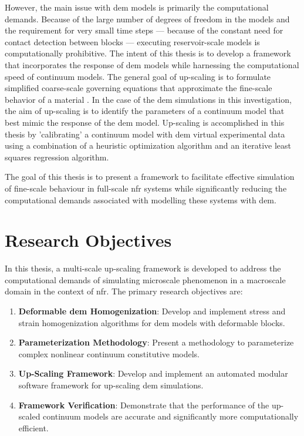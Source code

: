 However, the main issue with \acrshort{dem} models is primarily the computational demands. Because of the large number of degrees of freedom in the models and the requirement for very small time steps --- because of the constant need for contact detection between blocks --- executing reservoir-scale models is computationally prohibitive. The intent of this thesis is to develop a framework that incorporates the response of \acrshort{dem} models while harnessing the computational speed of continuum models. The general goal of up-scaling is to formulate simplified coarse-scale governing equations that approximate the fine-scale behavior of a material \citep{Geers_2010}. In the case of the \acrshort{dem} simulations in this investigation, the aim of up-scaling is to identify the parameters of a continuum model that best mimic the response of the \acrshort{dem} model.  Up-scaling is accomplished in this thesis by 'calibrating' a continuum model with \acrshort{dem} virtual experimental data using a combination of a heuristic optimization algorithm and an iterative least squares regression algorithm.

The goal of this thesis is to present a framework to facilitate effective simulation of fine-scale behaviour in full-scale \acrshort{nfr} systems while significantly reducing the computational demands associated with modelling these systems with \acrshort{dem}. 

\section{Research Objectives}

In this thesis, a multi-scale up-scaling framework is developed to address the computational demands of simulating microscale phenomenon in a macroscale domain in the context of \acrshort{nfr}. The primary research objectives are:

\begin{enumerate}
\item \textbf{Deformable \acrshort{dem} Homogenization}: Develop and implement stress and strain homogenization algorithms for \acrshort{dem} models with deformable blocks.
\item \textbf{Parameterization Methodology}: Present a methodology to parameterize complex nonlinear continuum constitutive models.
\item \textbf{Up-Scaling Framework}: Develop and implement an automated modular software framework for up-scaling \acrshort{dem} simulations.
\item \textbf{Framework Verification}: Demonstrate that the performance of the up-scaled continuum models are accurate and significantly more computationally efficient.
\end{enumerate}

